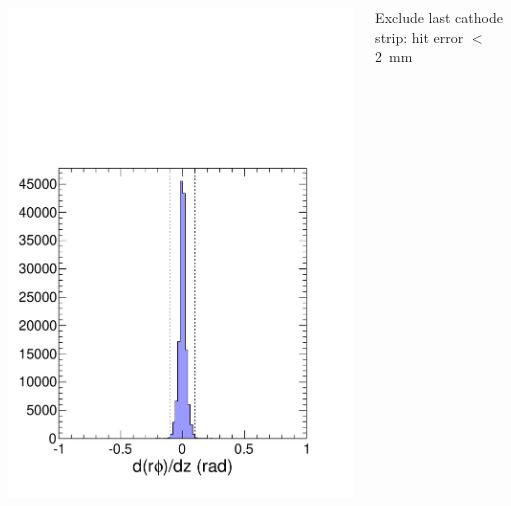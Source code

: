 \documentclass[compress]{beamer}
\begin{document}
\begin{frame}
\begin{columns}
\includegraphics[width=\linewidth]{MCBeamHalo_beamline_pointing.pdf}

Exclude last cathode strip: hit error $<$ 2~mm


\end{columns}
\end{frame}
\end{document}
